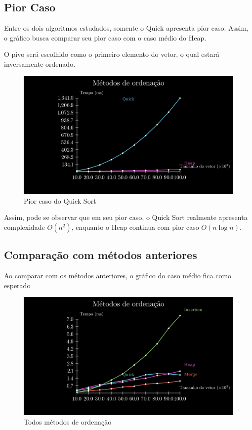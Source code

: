 \documentclass[fontsize=11pt]{article}
\begin{document}
  \subsection{Pior Caso}
    Entre os dois algoritmos estudados, somente o Quick apresenta pior
    caso. Assim, o gráfico busca comparar seu pior caso com o caso médio
    do Heap.
    
    O pivo será escolhido como o primeiro elemento do vetor, o qual estará
    inversamente ordenado.
    \begin{figure}[H]
      \includegraphics[width=\textwidth]{quickWorse.png} 
      \caption{Pior caso do Quick Sort}
      \label{fig:worse}
    \end{figure}
    Assim, pode se observar que em seu pior caso, o Quick Sort realmente 
    apresenta complexidade $O(n^2)$, enquanto o Heap continua com pior caso
    $O(n \log n)$.
  \subsection{Comparação com métodos anteriores}
    Ao comparar com os métodos anteriores, o gráfico do caso médio fica como esperado
    \begin{figure}[H]
      \includegraphics[width=\textwidth]{allgraphs.png} 
      \caption{Todos métodos de ordenação}
      \label{fig:all}
    \end{figure}
\end{document}
